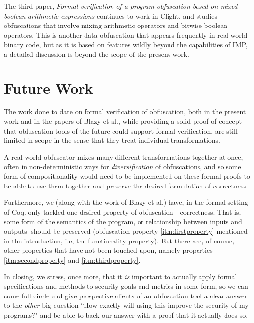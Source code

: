 \documentclass[compsoc,conference,a4paper,10pt,times]{IEEEtran}
\begin{document}
The third paper, \emph{Formal verification of a program obfuscation based on mixed boolean-arithmetic expressions} \cite{Blazy3} continues to work in Clight, and studies obfuscations that involve mixing arithmetic operators and bitwise boolean operators.  This is another data obfuscation that appears frequently in real-world binary code, but as it is based on features wildly beyond the capabilities of IMP, a detailed discussion is beyond the scope of the present work.

\section{Future Work}
The work done to date on formal verification of obfuscation, both in the present work and in the papers of Blazy et al., while providing a solid proof-of-concept that obfuscation tools of the future could support formal verification, are still limited in scope in the sense that they treat individual transformations.

A real world obfuscator mixes many different transformations together at once, often in non-deterministic ways for \emph{diversification} of obfuscations, and so some form of compositionality would need to be implemented on these formal proofs to be able to use them together and preserve the desired formulation of correctness. 

Furthermore, we
(along with the work of Blazy et al.)
have, in the formal setting of Coq, only tackled one desired property of obfuscation---correctness.  That is, some form of the semantics of the program, or relationship between inputs and outputs, should be preserved (obfuscation property \ref{itm:firstproperty} mentioned in the introduction, i.e, the functionality property). But there are, of course, other properties that have not been touched upon, namely properties \ref{itm:secondproperty} and \ref{itm:thirdproperty}.

In closing, we stress, once more, that it \emph{is} important to actually apply formal specifications and methods to security goals and metrics in some form, so we can come full circle and give prospective clients of an obfuscation tool a clear answer to the \emph{other} big question ``How exactly will using this improve the security of my programs?" and be able to back our answer with a proof that it actually does so.

%



\end{document}
